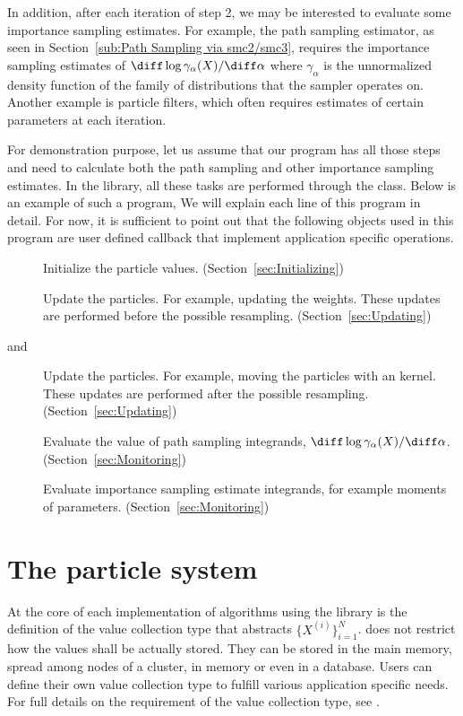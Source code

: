 In addition, after each iteration of step 2, we may be interested to evaluate
some importance sampling estimates. For example, the path sampling estimator,
as seen in Section~\ref{sub:Path Sampling via smc2/smc3}, requires the
importance sampling estimates of $\diff\log\gamma_{\alpha}(X)/\diff\alpha$
where $\gamma_{\alpha}$ is the unnormalized density function of the family of
distributions that the \smc sampler operates on. Another example is particle
filters, which often requires estimates of certain parameters at each
iteration.

For demonstration purpose, let us assume that our program has all those steps
and need to calculate both the path sampling and other importance sampling
estimates. In the \vsmc library, all these tasks are performed through the
 class. Below is an example of such a program,
We will explain each line of this program in detail. For now, it is sufficient
to point out that the following objects used in this program are user defined
callback that implement application specific operations.
\begin{description}
  \item[] Initialize the particle values.
    (Section~\ref{sec:Initializing})
  \item[] Update the particles. For example, updating the
    weights. These updates are performed before the possible resampling.
    (Section~\ref{sec:Updating})
  \item[ and ] Update the particles. For
    example, moving the particles with an \mcmc kernel. These updates are
    performed after the possible resampling. (Section~\ref{sec:Updating})
  \item[] Evaluate the value of path sampling integrands,
    $\diff\log\gamma_{\alpha}(X)/\diff\alpha$. (Section~\ref{sec:Monitoring})
  \item[] Evaluate importance sampling estimate
    integrands, for example moments of parameters.
    (Section~\ref{sec:Monitoring})
\end{description}

\section{The particle system}
\label{sec:The particle system}

At the core of each implementation of \smc algorithms using the \vsmc library
is the definition of the value collection type that abstracts
$\{X^{(i)}\}_{i=1}^N$. \vsmc does not restrict how the values shall be
actually stored. They can be stored in the main memory, spread among nodes of
a cluster, in \gpu memory or even in a database. Users can define their own
value collection type to fulfill various application specific needs. For full
details on the requirement of the value collection type, see \cite{vsmcjss}.

